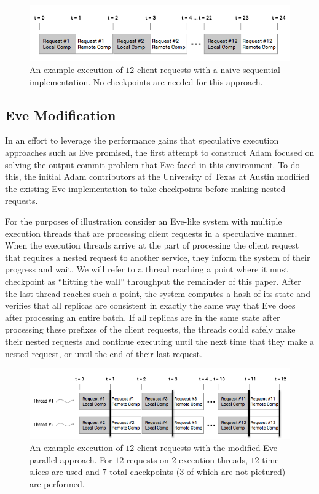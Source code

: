 \documentclass[11pt, oneside]{report}
\begin{document}
\begin{figure}[h]
\centering
\includegraphics[width=1.0\textwidth]{NaiveSequential.png}
\caption{\label{NaiveSequential}An example execution of $12$ client requests with a naive sequential implementation. No checkpoints are needed for this approach.}
\end{figure}

\subsection{Eve Modification}\label{EveModification}

In an effort to leverage the performance gains that speculative execution approaches such as Eve promised, the first attempt to construct Adam focused on solving the output commit problem that Eve faced in this environment. 
To do this, the initial Adam contributors at the University of Texas at Austin modified the existing Eve implementation to take checkpoints before making nested requests. 

For the purposes of illustration consider an Eve-like system with multiple execution threads that are processing client requests in a speculative manner. 
When the execution threads arrive at the part of processing the client request that requires a nested request to another service, they inform the system of their progress and wait.
We will refer to a thread reaching a point where it must checkpoint as ``hitting the wall'' throughput the remainder of this paper.
After the last thread reaches such a point, the system computes a hash of its state and verifies that all replicas are consistent in exactly the same way that Eve does after processing an entire batch. 
If all replicas are in the same state after processing these prefixes of the client requests, the threads could safely make their nested requests and continue executing until the next time that they make a nested request, or until the end of their last request.

\begin{figure}[h]
\centering
\includegraphics[width=1.0\textwidth]{Parallel.png}
\caption{\label{parallel}An example execution of $12$ client requests with the modified Eve parallel approach. For $12$ requests on $2$ execution threads, $12$ time slices are used and $7$ total checkpoints ($3$ of which are not pictured) are performed.}
\end{figure}
\end{document}
